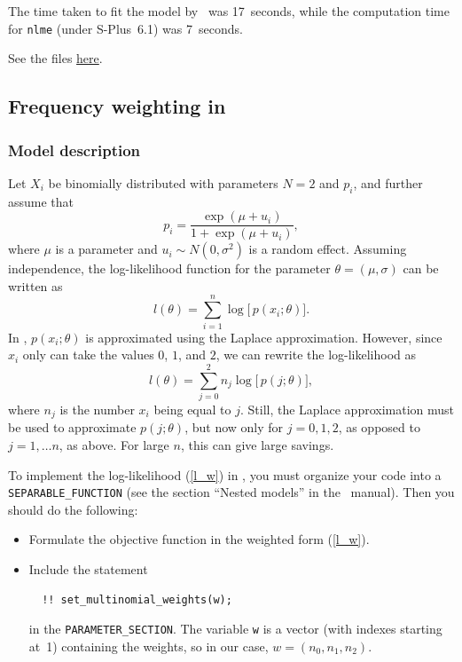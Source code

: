 \documentclass{admbmanual}
\begin{document}
The time taken to fit the model by \scAR\ was 17~seconds, while the computation
time for \texttt{nlme} (under S-Plus~6.1) was 7~seconds.

See the files
\href{http://www.admb-project.org/otter-research/admbre/examples/pheno/pheno.html}{here}.

\subsection{Frequency weighting in \scAR}
\label{seq:frequency_example}

\subsubsection{Model description}

Let $X_i$ be binomially distributed with parameters $N=2$ and $p_i$, and
further assume that
\begin{equation}
  p_i=\frac{\exp (\mu +u_i)}{1+\exp (\mu +u_i)},
\end{equation}%
where $\mu $ is a parameter and $u_i\sim N(0,\sigma^2)$ is a random effect.
Assuming independence, the log-likelihood function for the parameter $\theta
=(\mu,\sigma)$ can be written as
\begin{equation}
  l(\theta)=\sum_{i=1}^n\log \bigl[\, p(x_i;\theta)\bigr] .
\end{equation}%
In \scAR, $p(x_i;\theta)$ is approximated using the Laplace approximation.
However, since $x_i$ only can take the values $0$, $1$, and $2$, we can
rewrite the log-likelihood as
\begin{equation}
  l(\theta)=\sum_{j=0}^2n_j\log \bigl[\, p(j;\theta)\bigr],  \label{l_w}
\end{equation}%
where $n_j$ is the number $x_i$ being equal to $j$. Still, the Laplace
approximation must be used to approximate $p(j;\theta)$, but now only for
$j=0,1,2$, as opposed to $j = 1,\dots n$, as above. For large $n$, this can give
large savings.

To implement the log-likelihood (\ref{l_w}) in \scAR, you must organize your
code into a \texttt{SEPARABLE\_FUNCTION} (see the section ``Nested models'' in
the \scAR\ manual). Then you should do the following:
\begin{itemize}
  \item Formulate the objective function in the weighted form (\ref{l_w}).

  \item Include the statement
  \begin{lstlisting}
  !! set_multinomial_weights(w);
  \end{lstlisting}
  in the \texttt{PARAMETER\_SECTION}. The variable \texttt{w} is a vector (with
  indexes starting at~1) containing the weights, so in our case,
  $w=(n_0,n_1,n_2)$.
\end{itemize}
\end{document}
